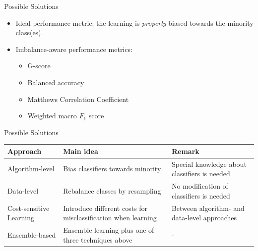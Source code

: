 \documentclass[11pt,compress,t,notes=noshow, xcolor=table]{beamer}
\begin{document}
\begin{vbframe}{Possible Solutions}
	\begin{itemize}
        
		\item Ideal performance metric: the learning is \emph{properly} biased towards the minority class(es).	

        \item Imbalance-aware performance metrics:
        \begin{itemize}
            \item G-score
            \item Balanced accuracy
            \item Matthews Correlation Coefficient
            \item Weighted macro $F_1$ score
        \end{itemize}
	\end{itemize}
\end{vbframe} 


\begin{vbframe}{Possible Solutions}
\begin{table}[h]
\footnotesize
    \centering
    \begin{tabular}{p{} p{} p{}}
        \toprule
        \textbf{Approach} & \textbf{Main idea} & \textbf{Remark} \\ [5pt]
        \hline
        Algorithm-level & Bias classifiers towards minority & Special knowledge about classifiers is needed \\ [5pt]
        \hline
        Data-level & Rebalance classes by resampling & No modification of classifiers is needed \\ [5pt]
        \hline
        Cost-sensitive Learning & Introduce different costs for misclassification when learning & Between algorithm- and data-level approaches \\ [15pt]
        \hline
        Ensemble-based & Ensemble learning plus one of three techniques above & - \\ [5pt]
        \bottomrule
    \end{tabular}
\end{table}

\end{vbframe}



\endlecture
\end{document}
